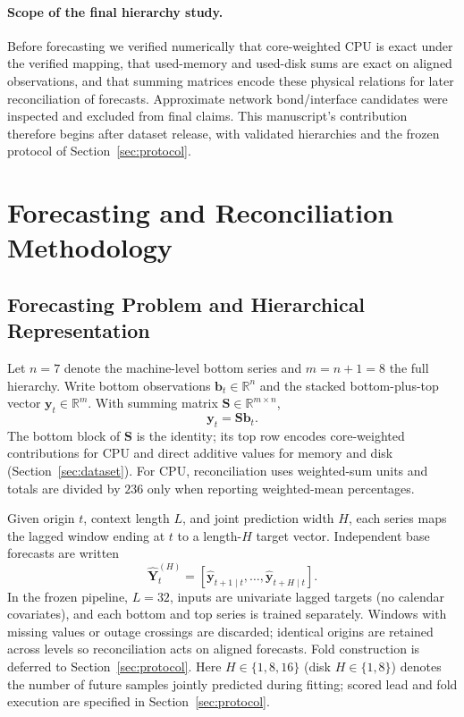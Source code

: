 \documentclass[a4paper,fleqn]{cas-dc}
\begin{document}
\paragraph{Scope of the final hierarchy study.}
Before forecasting we verified numerically that core-weighted {CPU} is exact
under the verified mapping, that used-memory and used-disk sums are exact on
aligned observations, and that summing matrices encode these physical relations
for later reconciliation of forecasts.
Approximate network bond/interface candidates were inspected and excluded from
final claims.
This manuscript's contribution therefore begins after dataset release, with
validated hierarchies and the frozen protocol of Section~\ref{sec:protocol}.



\section{Forecasting and Reconciliation Methodology}
\label{sec:methods}

\subsection{Forecasting Problem and Hierarchical Representation}
\label{sec:forecast-problem}
Let $n=7$ denote the machine-level bottom series and $m=n+1=8$ the full
hierarchy.
Write bottom observations $\mathbf{b}_t\in\mathbb{R}^{n}$ and the stacked
bottom-plus-top vector $\mathbf{y}_t\in\mathbb{R}^{m}$.
With summing matrix $\mathbf{S}\in\mathbb{R}^{m\times n}$,
\begin{equation}
\mathbf{y}_t=\mathbf{S}\mathbf{b}_t.
\label{eq:hierarchy}
\end{equation}
The bottom block of $\mathbf{S}$ is the identity; its top row encodes
core-weighted contributions for {CPU} and direct additive values for memory and
disk (Section~\ref{sec:dataset}).
For {CPU}, reconciliation uses weighted-sum units and totals are divided by
$236$ only when reporting weighted-mean percentages.

Given origin $t$, context length $L$, and joint prediction width $H$, each series
maps the lagged window ending at $t$ to a length-$H$ target vector.
Independent base forecasts are written
\[
\widehat{\mathbf{Y}}_{t}^{(H)}
=
\left[
\widehat{\mathbf{y}}_{t+1\mid t},
\ldots,
\widehat{\mathbf{y}}_{t+H\mid t}
\right].
\]
In the frozen pipeline, $L=32$, inputs are univariate lagged targets (no
calendar covariates), and each bottom and top series is trained separately.
Windows with missing values or outage crossings are discarded; identical
origins are retained across levels so reconciliation acts on aligned forecasts.
Fold construction is deferred to Section~\ref{sec:protocol}.
Here $H\in\{1,8,16\}$ (disk $H\in\{1,8\}$) denotes the number of future samples
jointly predicted during fitting; scored lead and fold execution are specified
in Section~\ref{sec:protocol}.
\end{document}
